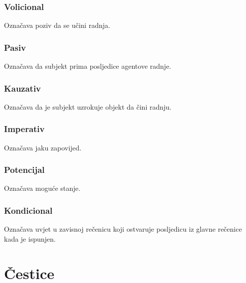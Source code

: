 \documentclass[a4paper, 12pt]{amsart}
\begin{document}
  \subsubsection*{Volicional}
  Označava poziv da se učini radnja.

  \subsubsection*{Pasiv}
  Označava da subjekt prima posljedice agentove radnje.

  \subsubsection*{Kauzativ}
  Označava da je subjekt uzrokuje objekt da čini radnju.

  \subsubsection*{Imperativ}
  Označava jaku zapovijed.

  \subsubsection*{Potencijal}
  Označava moguće stanje.

  \subsubsection*{Kondicional}
  Označava uvjet u zavisnoj rečenicu koji ostvaruje posljedicu iz glav\-ne rečenice kada je ispunjen.

  \section{Čestice}
\end{document}
